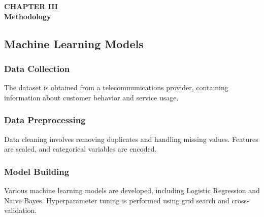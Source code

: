 \section*{}
\begin{center}
    {\fontsize{14}{1.5}\selectfont \textbf{CHAPTER III}}\\
    \vspace{12pt}
    {\fontsize{16}{1.5}\selectfont \textbf{Methodology}}\\
    \vspace{12pt}
    \vspace{12pt}
\end{center}

\setcounter{section}{3}
\setcounter{subsection}{0}

\renewcommand{\theequation}{\thesection.\arabic{equation}}
\renewcommand{\thetable}{\thesection.\arabic{table}}
\renewcommand{\thefigure}{\thesection.\arabic{figure}}
\setcounter{table}{0}
\setcounter{figure}{0}
\setcounter{equation}{0}
\setlength{\parindent}{0pt}

\subsection{Machine Learning Models}

\subsubsection{Data Collection}

The dataset is obtained from a telecommunications provider, containing information about customer behavior and service usage.
\subsubsection{Data Preprocessing}

Data cleaning involves removing duplicates and handling missing values.
Features are scaled, and categorical variables are encoded.
\subsubsection{Model Building}

Various machine learning models are developed, including Logistic Regression and Naive Bayes.
Hyperparameter tuning is performed using grid search and cross-validation.

